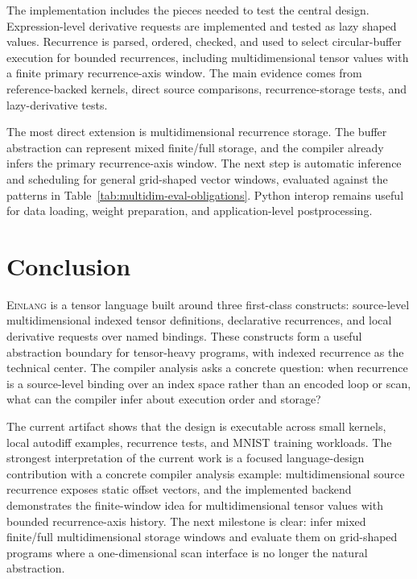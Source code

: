 \documentclass[sigplan,screen,nonacm]{acmart}
\newcommand{\einlang}{\textsc{Einlang}}
\begin{document}
The implementation includes the pieces needed to test the central design. Expression-level derivative requests are implemented and tested as lazy shaped values. Recurrence is parsed, ordered, checked, and used to select circular-buffer execution for bounded recurrences, including multidimensional tensor values with a finite primary recurrence-axis window. The main evidence comes from reference-backed kernels, direct source comparisons, recurrence-storage tests, and lazy-derivative tests.

The most direct extension is multidimensional recurrence storage. The buffer abstraction can represent mixed finite/full storage, and the compiler already infers the primary recurrence-axis window. The next step is automatic inference and scheduling for general grid-shaped vector windows, evaluated against the patterns in Table~\ref{tab:multidim-eval-obligations}. Python interop remains useful for data loading, weight preparation, and application-level postprocessing.

\section{Conclusion}

\einlang{} is a tensor language built around three first-class constructs: source-level multidimensional indexed tensor definitions, declarative recurrences, and local derivative requests over named bindings. These constructs form a useful abstraction boundary for tensor-heavy programs, with indexed recurrence as the technical center. The compiler analysis asks a concrete question: when recurrence is a source-level binding over an index space rather than an encoded loop or scan, what can the compiler infer about execution order and storage?

The current artifact shows that the design is executable across small kernels, local autodiff examples, recurrence tests, and MNIST training workloads. The strongest interpretation of the current work is a focused language-design contribution with a concrete compiler analysis example: multidimensional source recurrence exposes static offset vectors, and the implemented backend demonstrates the finite-window idea for multidimensional tensor values with bounded recurrence-axis history. The next milestone is clear: infer mixed finite/full multidimensional storage windows and evaluate them on grid-shaped programs where a one-dimensional scan interface is no longer the natural abstraction.



\end{document}
